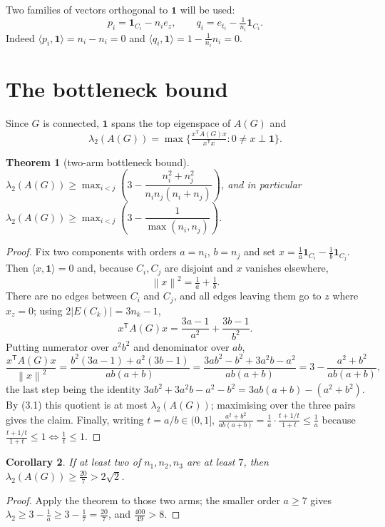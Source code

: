\documentclass[11pt,a4paper]{article}
\theoremstyle{plain}
\newtheorem{theorem}{Theorem}[section]
\newtheorem{corollary}[theorem]{Corollary}
\theoremstyle{definition}
\newcommand{\norm}[1]{\left\lVert #1\right\rVert}
\newcommand{\bdG}{A(G)}
\newcommand{\ind}{\mathbf 1}
\begin{document}
Two families of vectors orthogonal to $\mathbf 1$ will be used:
\[
  p_i=\ind_{C_i}-n_i e_z,\qquad
  q_i=e_{t_i}-\tfrac1{n_i}\ind_{C_i}.
\tag{2.1}
\]
Indeed $\langle p_i,\mathbf 1\rangle=n_i-n_i=0$ and
$\langle q_i,\mathbf 1\rangle=1-\frac1{n_i}n_i=0$.

\section{The bottleneck bound}

Since $G$ is connected, $\mathbf 1$ spans the top eigenspace of $\bdG$ and
\[
  \lambda_2(\bdG)=\max\Big\{\tfrac{x^{\mathsf T}\bdG x}{x^{\mathsf T}x}:
  0\neq x\perp\mathbf 1\Big\}.
\tag{3.1}
\]

\begin{theorem}[two-arm bottleneck bound]
$\lambda_2(\bdG)\ge\max_{i<j}\left(3-\dfrac{n_i^2+n_j^2}{n_in_j(n_i+n_j)}\right)$,
and in particular $\lambda_2(\bdG)\ge\max_{i<j}\left(3-\dfrac1{\max(n_i,n_j)}\right)$.
\end{theorem}

\begin{proof}
Fix two components with orders $a=n_i$, $b=n_j$ and set
$x=\tfrac1a\ind_{C_i}-\tfrac1b\ind_{C_j}$. Then $\langle x,\mathbf 1\rangle=0$
and, because $C_i,C_j$ are disjoint and $x$ vanishes elsewhere,
\[
  \norm{x}^{2}=\tfrac1a+\tfrac1b.
\]
There are no edges between $C_i$ and $C_j$, and all edges leaving them go to $z$
where $x_z=0$; using $2|E(C_k)|=3n_k-1$,
\[
  x^{\mathsf T}\bdG x=\frac{3a-1}{a^2}+\frac{3b-1}{b^2}.
\]
Putting numerator over $a^2b^2$ and denominator over $ab$,
\[
  \frac{x^{\mathsf T}\bdG x}{\norm{x}^{2}}
  =\frac{b^2(3a-1)+a^2(3b-1)}{ab(a+b)}
  =\frac{3ab^{2}-b^{2}+3a^{2}b-a^{2}}{ab(a+b)}
  =3-\frac{a^{2}+b^{2}}{ab(a+b)},
\]
the last step being the identity
$3ab^{2}+3a^{2}b-a^{2}-b^{2}=3ab(a+b)-(a^{2}+b^{2})$. By (3.1) this
quotient is at most $\lambda_2(\bdG)$; maximising over the three pairs gives the
claim. Finally, writing $t=a/b\in(0,1]$,
$\frac{a^2+b^2}{ab(a+b)}=\frac1a\cdot\frac{t+1/t}{1+t}\le\frac1a$ because
$\frac{t+1/t}{1+t}\le1\iff\frac1t\le1$.
\end{proof}

\begin{corollary}
If at least two of $n_1,n_2,n_3$ are at least $7$, then
$\lambda_2(\bdG)\ge\frac{20}{7}>2\sqrt2$.
\end{corollary}

\begin{proof}
Apply the theorem to those two arms; the smaller order $a\ge7$ gives
$\lambda_2\ge3-\frac1a\ge3-\frac17=\frac{20}{7}$, and
$\frac{400}{49}>8$.
\end{proof}
\end{document}
